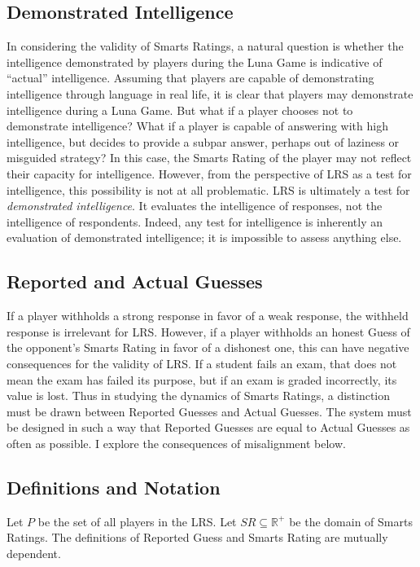 \subsection{Demonstrated Intelligence}

In considering the validity of Smarts Ratings, a natural question is whether the intelligence demonstrated by players during the Luna Game is indicative of ``actual'' intelligence. Assuming that players are capable of demonstrating intelligence through language in real life, it is clear that players may demonstrate intelligence during a Luna Game. But what if a player chooses not to demonstrate intelligence? What if a player is capable of answering with high intelligence, but decides to provide a subpar answer, perhaps out of laziness or misguided strategy? In this case, the Smarts Rating of the player may not reflect their capacity for intelligence. However, from the perspective of LRS as a test for intelligence, this possibility is not at all problematic. LRS is ultimately a test for \textit{demonstrated intelligence}. It evaluates the intelligence of responses, not the intelligence of respondents. Indeed, any test for intelligence is inherently an evaluation of demonstrated intelligence; it is impossible to assess anything else. 

\subsection{Reported and Actual Guesses}

If a player withholds a strong response in favor of a weak response, the withheld response is irrelevant for LRS. However, if a player withholds an honest Guess of the opponent's Smarts Rating in favor of a dishonest one, this can have negative consequences for the validity of LRS. If a student fails an exam, that does not mean the exam has failed its purpose, but if an exam is graded incorrectly, its value is lost. Thus in studying the dynamics of Smarts Ratings, a distinction must be drawn between Reported Guesses and Actual Guesses. The system must be designed in such a way that Reported Guesses are equal to Actual Guesses as often as possible. I explore the consequences of misalignment below.


\subsection{Definitions and Notation}

Let $P$ be the set of all players in the LRS. Let $SR \subseteq \mathbb{R}^+$ be the domain of Smarts Ratings. The definitions of Reported Guess and Smarts Rating are mutually dependent.

